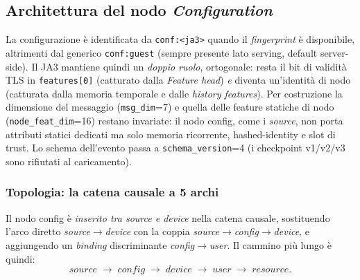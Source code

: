 \documentclass[11pt,a4paper]{report}
\begin{document}
\subsection{Architettura del nodo \textit{Configuration}}

La configurazione è identificata da \texttt{conf:<ja3>} quando il \emph{fingerprint} è disponibile, altrimenti dal generico \texttt{conf:guest} (sempre presente lato serving, default server-side). Il JA3 mantiene quindi un \emph{doppio ruolo}, ortogonale: resta il bit di validità TLS in \texttt{features[0]} (catturato dalla \textit{Feature head}) \emph{e} diventa un'identità di nodo (catturata dalla memoria temporale e dalle \textit{history features}). Per costruzione la dimensione del messaggio (\texttt{msg\_dim}=7) e quella delle feature statiche di nodo (\texttt{node\_feat\_dim}=16) restano invariate: il nodo config, come i \textit{source}, non porta attributi statici dedicati ma solo memoria ricorrente, hashed-identity e slot di trust. Lo schema dell'evento passa a \texttt{schema\_version}=4 (i checkpoint v1/v2/v3 sono rifiutati al caricamento).

\subsubsection{Topologia: la catena causale a 5 archi}

Il nodo config è \emph{inserito tra source e device} nella catena causale, sostituendo l'arco diretto \textit{source}$\rightarrow$\textit{device} con la coppia \textit{source}$\rightarrow$\textit{config}$\rightarrow$\textit{device}, e aggiungendo un \emph{binding} discriminante \textit{config}$\rightarrow$\textit{user}. Il cammino più lungo è quindi:
\[
\textit{source} \;\rightarrow\; \textit{config} \;\rightarrow\; \textit{device} \;\rightarrow\; \textit{user} \;\rightarrow\; \textit{resource}.
\]
\end{document}
